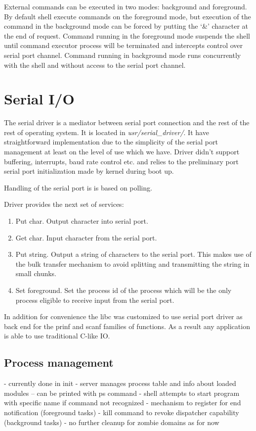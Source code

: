 \documentclass[a4paper,10pt]{article}
\newcommand{\filepath}[1]{\emph{ #1}}
\begin{document}
	External commands can be executed in two modes: background and foreground.
	By default shell execute commands on the foreground mode, but execution of the command in the background mode can be forced by putting the `\&' character at the end of request.
	Command running in the foreground mode suspends the shell until command executor process will be terminated and intercepts control over serial port channel.
	Command running in background mode runs concurrently with the shell and without access to the serial port channel.
    	    	
	 \section{Serial I/O}
	 	The serial driver is a mediator between serial port connection and the rest of the rest of operating system. It is located in \filepath{usr/serial\_driver/}.
	 	It have straightforward implementation due to the simplicity of the serial port management at least on the level of use which we have.
	 	Driver didn't support buffering, interrupts, baud rate control etc. and relies to the preliminary port serial port initialization made by kernel during boot up.
	 	
	 	Handling of the serial port is is based on polling.
		
		Driver provides the next set of services:
		\begin{enumerate}
			\item Put char. Output character into serial port.
			\item Get char. Input character from the serial port.
			\item Put string. Output a string of characters to the serial port. This makes use of the bulk transfer mechanism to avoid splitting and transmitting the string in small chunks.
			\item Set foreground. Set the process id of the process which will be the only process eligible to receive input from the serial port.
		\end{enumerate}
		
		In addition for convenience the libc was customized to use serial port driver as back end for the prinf and scanf families of functions.
		As a result any application is able to use traditional C-like IO.

\subsection{Process management}
\label{sec:process-management}
- currently done in init
- server manages process table and info about loaded modules
-- can be printed with ps command
- shell attempts to start program with specific name if command not recognized
- mechanism to register for end notification (foreground tasks)
- kill command to revoke dispatcher capability (background tasks)
- no further cleanup for zombie domains as for now
\end{document}

